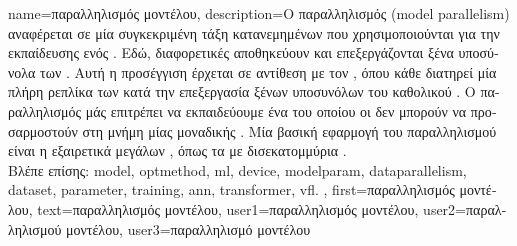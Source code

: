 {name={\foreignlanguage{greek}{παραλληλισμός μοντέλου}},
	description={\foreignlanguage{greek}{Ο παραλληλισμός}  
		(model parallelism) \foreignlanguage{greek}{αναφέρεται σε μία συγκεκριμένη τάξη κατανεμημένων}  
		 \foreignlanguage{greek}{που χρησιμοποιούνται για την εκπαίδευσης ενός}  .  
		\foreignlanguage{greek}{Εδώ, διαφορετικές}  \foreignlanguage{greek}{αποθηκεύουν και επεξεργάζονται ξένα υποσύνολα 
		των} . \foreignlanguage{greek}{Αυτή η προσέγγιση έρχεται σε αντίθεση με τον} , 
		\foreignlanguage{greek}{όπου κάθε}  \foreignlanguage{greek}{διατηρεί μία πλήρη ρεπλίκα των}  
		\foreignlanguage{greek}{κατά την επεξεργασία ξένων υποσυνόλων του καθολικού} . 
		\foreignlanguage{greek}{Ο παραλληλισμός}  \foreignlanguage{greek}{μάς επιτρέπει να εκπαιδεύουμε ένα}   
		  \foreignlanguage{greek}{του οποίου οι}  \foreignlanguage{greek}{δεν μπορούν 
		να προσαρμοστούν στη μνήμη μίας μοναδικής} . 
		\foreignlanguage{greek}{Μία βασική εφαρμογή του παραλληλισμού}  \foreignlanguage{greek}{είναι η}  
		\foreignlanguage{greek}{εξαιρετικά μεγάλων} , \foreignlanguage{greek}{όπως τα}   
		\foreignlanguage{greek}{με δισεκατομμύρια} . 
             	\\
             	\foreignlanguage{greek}{Βλέπε επίσης:} \gls{model}, \gls{optmethod}, \gls{ml}, \gls{device}, \gls{modelparam}, \gls{dataparallelism}, 
		\gls{dataset}, \gls{parameter}, \gls{training}, \gls{ann}, \gls{transformer}, \gls{vfl}. },
	first={\foreignlanguage{greek}{παραλληλισμός μοντέλου}},
 	text={\foreignlanguage{greek}{παραλληλισμός μοντέλου}},
	user1={\foreignlanguage{greek}{παραλληλισμός μοντέλου}}, %
	user2={\foreignlanguage{greek}{παραλληλισμού μοντέλου}}, %
	user3={\foreignlanguage{greek}{παραλληλισμό μοντέλου}} %
}

